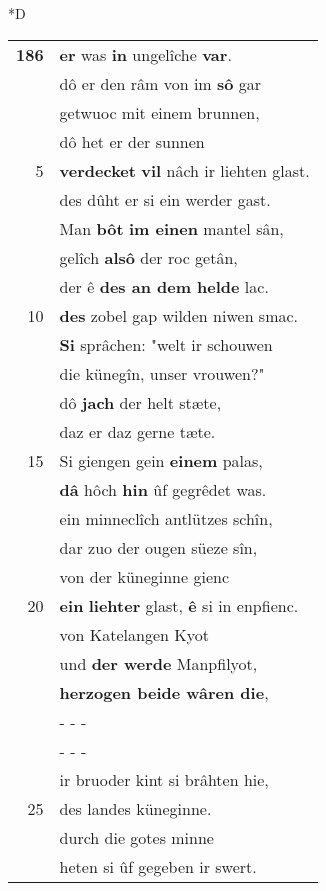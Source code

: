 \documentclass[8pt,a4paper,notitlepage]{article}
\begin{document}
\begin{table}[ht]
\begin{minipage}[t]{0.5\linewidth}
\small
\begin{center}*D
\end{center}
\begin{tabular}{rl}
\textbf{186} & \textbf{er} was \textbf{in} ungelîche \textbf{var}.\\ 
 & dô er den râm von im \textbf{sô} gar\\ 
 & getwuoc mit einem brunnen,\\ 
 & dô het er der sunnen\\ 
5 & \textbf{verdecket} \textbf{vil} nâch ir liehten glast.\\ 
 & des dûht er si ein werder gast.\\ 
 & Man \textbf{bôt} \textbf{im einen} mantel sân,\\ 
 & gelîch \textbf{alsô} der roc getân,\\ 
 & der ê \textbf{des an dem helde} lac.\\ 
10 & \textbf{des} zobel gap wilden niwen smac.\\ 
 & \textbf{Si} sprâchen: "welt ir schouwen\\ 
 & die künegîn, unser vrouwen?"\\ 
 & dô \textbf{jach} der helt stæte,\\ 
 & daz er daz gerne tæte.\\ 
15 & Si giengen gein \textbf{einem} palas,\\ 
 & \textbf{dâ} hôch \textbf{hin} ûf gegrêdet was.\\ 
 & ein minneclîch antlützes schîn,\\ 
 & dar zuo der ougen süeze sîn,\\ 
 & von der küneginne gienc\\ 
20 & \textbf{ein} \textbf{liehter} glast, \textbf{ê} si in enpfienc.\\ 
 & von Katelangen Kyot\\ 
 & und \textbf{der werde} Manpfilyot,\\ 
 & \textbf{herzogen beide wâren die},\\ 
 & \multicolumn{1}{l}{ - - - }\\ 
 & \multicolumn{1}{l}{ - - - }\\ 
 & ir bruoder kint si brâhten hie,\\ 
25 & des landes küneginne.\\ 
 & durch die gotes minne\\ 
 & heten si ûf gegeben ir swert.\\ 

\end{tabular}
\end{minipage}
\end{table}
\end{document}
